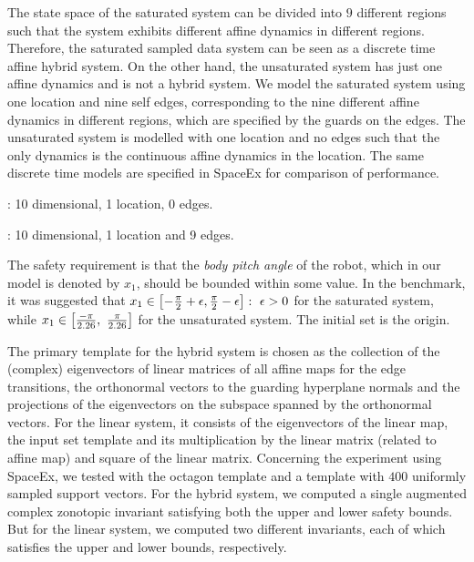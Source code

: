 
The state space of the saturated system can be divided into $9$
different regions such that the system exhibits different affine
dynamics in different regions. Therefore, the saturated sampled data
system can be seen as a discrete time affine hybrid system.  On the
other hand, the unsaturated system has just one affine dynamics and is
not a hybrid system.  We model the saturated system using one location
and nine self edges, corresponding to the nine different affine
dynamics in different regions, which are specified by the guards on
the edges.  The unsaturated system is modelled with one location and
no edges such that the only dynamics is the continuous affine dynamics
in the location. The same discrete time models are specified in
SpaceEx for comparison of performance.


: 10 dimensional, 1 location, 0 edges.

: 10 dimensional, 1 location and 9 edges.

The safety requirement is that the \emph{body pitch angle} of the
robot, which in our model is denoted by $x_1$, should be bounded
within some value. In the benchmark, it was suggested that
$x_1\in\left[-\frac{\pi}{2}+\epsilon,\frac{\pi}{2}-\epsilon\right]:~\epsilon>0$
for the saturated system, while
$x_1\in\left[\frac{-\pi}{2.26},~\frac{\pi}{2.26}\right]$ for the
unsaturated system. The initial set is the origin.
\vspace{0.5em}

  The primary template for the hybrid system is
chosen as the collection of the (complex) eigenvectors of linear
matrices of all affine maps for the edge transitions, the orthonormal
vectors to the guarding hyperplane normals and the projections of the
eigenvectors on the subspace spanned by the orthonormal vectors.  For
the linear system, it consists of the eigenvectors of the linear map,
the input set template and its multiplication by the linear matrix
(related to affine map) and square of the linear matrix. Concerning the experiment using
SpaceEx, we tested with the octagon template and a
template with $400$ uniformly sampled support vectors.  For the hybrid
system, we computed a single augmented complex zonotopic invariant
satisfying both the upper and lower safety bounds.  But for the linear
system, we computed two different invariants, each of which satisfies the
upper and lower bounds, respectively.

